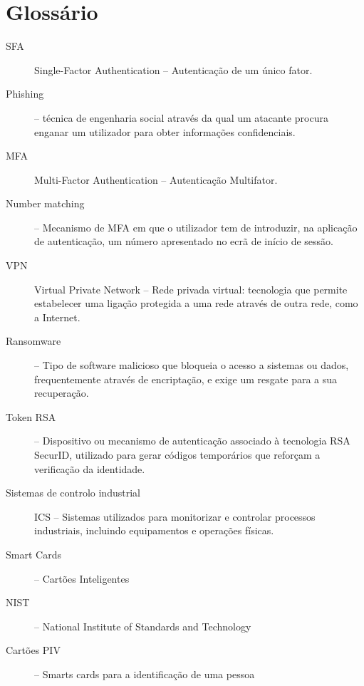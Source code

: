 \section{Glossário}

\begin{description}
    \item[SFA] Single-Factor Authentication -- Autenticação de um único fator.
    \item[Phishing] -- técnica de engenharia social através da qual um atacante procura enganar um utilizador para obter informações confidenciais.
    \item[MFA] Multi-Factor Authentication -- Autenticação Multifator.
    \item[Number matching] -- Mecanismo de MFA em que o utilizador tem de introduzir, na aplicação de autenticação, um número apresentado no ecrã de início de sessão.
    \item[VPN] Virtual Private Network -- Rede privada virtual: tecnologia que permite estabelecer uma ligação protegida a uma rede através de outra rede, como a Internet.
    \item[Ransomware] -- Tipo de software malicioso que bloqueia o acesso a sistemas ou dados, frequentemente através de encriptação, e exige um resgate para a sua recuperação.
    \item[Token RSA] -- Dispositivo ou mecanismo de autenticação associado à tecnologia RSA SecurID, utilizado para gerar códigos temporários que reforçam a verificação da identidade.
    \item[Sistemas de controlo industrial] ICS -- Sistemas utilizados para monitorizar e controlar processos industriais, incluindo equipamentos e operações físicas.
    \item[Smart Cards] -- Cartões Inteligentes 
    \item[NIST] -- National Institute of Standards and Technology 
    \item[Cartões PIV] -- Smarts cards para a identificação de uma pessoa

\end{description}
